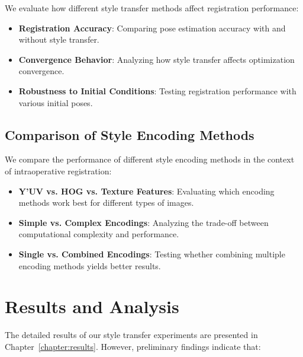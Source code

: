 We evaluate how different style transfer methods affect registration performance:

\begin{itemize}
    \item \textbf{Registration Accuracy}: Comparing pose estimation accuracy with and without style transfer.
    
    \item \textbf{Convergence Behavior}: Analyzing how style transfer affects optimization convergence.
    
    \item \textbf{Robustness to Initial Conditions}: Testing registration performance with various initial poses.
\end{itemize}

\subsection{Comparison of Style Encoding Methods}

We compare the performance of different style encoding methods in the context of intraoperative registration:

\begin{itemize}
    \item \textbf{Y'UV vs. HOG vs. Texture Features}: Evaluating which encoding methods work best for different types of images.
    
    \item \textbf{Simple vs. Complex Encodings}: Analyzing the trade-off between computational complexity and performance.
    
    \item \textbf{Single vs. Combined Encodings}: Testing whether combining multiple encoding methods yields better results.
\end{itemize}

\section{Results and Analysis}

The detailed results of our style transfer experiments are presented in Chapter~\ref{chapter:results}. However, preliminary findings indicate that:

